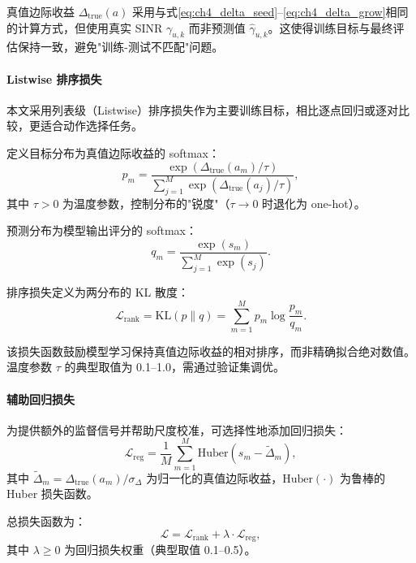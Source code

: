 \documentclass[type=master]{fduthesis}
\begin{document}
真值边际收益 $\Delta_{\text{true}}(a)$ 采用与式\eqref{eq:ch4_delta_seed}--\eqref{eq:ch4_delta_grow}相同的计算方式，但使用真实 SINR $\gamma_{u,k}$ 而非预测值 $\hat{\gamma}_{u,k}$。这使得训练目标与最终评估保持一致，避免"训练-测试不匹配"问题。

\paragraph{Listwise 排序损失}
本文采用列表级（Listwise）排序损失作为主要训练目标，相比逐点回归或逐对比较，更适合动作选择任务。

定义目标分布为真值边际收益的 softmax：
\begin{equation}
p_m = \frac{\exp(\Delta_{\text{true}}(a_m) / \tau)}{\sum_{j=1}^{M} \exp(\Delta_{\text{true}}(a_j) / \tau)},
\label{eq:ch4_target_dist}
\end{equation}
其中 $\tau > 0$ 为温度参数，控制分布的"锐度"（$\tau \to 0$ 时退化为 one-hot）。

预测分布为模型输出评分的 softmax：
\begin{equation}
q_m = \frac{\exp(s_m)}{\sum_{j=1}^{M} \exp(s_j)}.
\label{eq:ch4_pred_dist}
\end{equation}

排序损失定义为两分布的 KL 散度：
\begin{equation}
\mathcal{L}_{\text{rank}} = \text{KL}(p \| q) = \sum_{m=1}^{M} p_m \log\frac{p_m}{q_m}.
\label{eq:ch4_kl_loss}
\end{equation}

该损失函数鼓励模型学习保持真值边际收益的相对排序，而非精确拟合绝对数值。温度参数 $\tau$ 的典型取值为 0.1--1.0，需通过验证集调优。

\paragraph{辅助回归损失}
为提供额外的监督信号并帮助尺度校准，可选择性地添加回归损失：
\begin{equation}
\mathcal{L}_{\text{reg}} = \frac{1}{M} \sum_{m=1}^{M} \text{Huber}(s_m - \tilde{\Delta}_m),
\label{eq:ch4_reg_loss}
\end{equation}
其中 $\tilde{\Delta}_m = \Delta_{\text{true}}(a_m) / \sigma_\Delta$ 为归一化的真值边际收益，$\text{Huber}(\cdot)$ 为鲁棒的 Huber 损失函数。

总损失函数为：
\begin{equation}
\mathcal{L} = \mathcal{L}_{\text{rank}} + \lambda \cdot \mathcal{L}_{\text{reg}},
\label{eq:ch4_total_loss}
\end{equation}
其中 $\lambda \geq 0$ 为回归损失权重（典型取值 0.1--0.5）。
\end{document}
